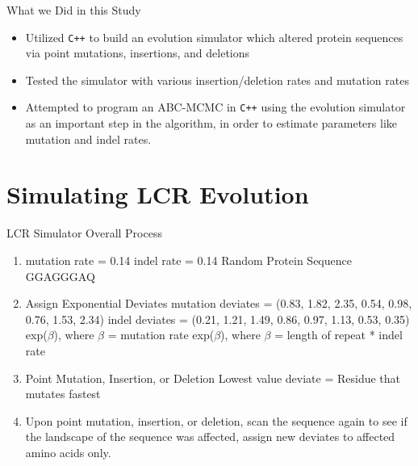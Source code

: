 \documentclass{beamer}
\begin{document}
	\begin{frame}{What we Did in this Study}
		\begin{itemize}
			\item Utilized \texttt{C++} to build an evolution simulator which altered protein sequences via point mutations, insertions, and deletions \newline
			\item Tested the simulator with various insertion/deletion rates and mutation rates \newline
			\item Attempted to program an ABC-MCMC in \texttt{C++} using the evolution simulator as an important step in the algorithm, in order to estimate parameters like mutation and indel rates.
		\end{itemize}
	\end{frame}

	\section{Simulating LCR Evolution}
	
	\begin{frame}{LCR Simulator Overall Process}
		\begin{center}
			\begin{enumerate}
			\item mutation rate = 0.14
				indel rate = 0.14 \newline
				Random Protein Sequence \newline	
				GGAGGGAQ \newline\pause	
				
				\item Assign Exponential Deviates \newline
				mutation deviates = (0.83, 1.82, 2.35, 0.54, 0.98, 0.76, 1.53, 2.34) \newline
				indel deviates = (0.21, 1.21, 1.49, 0.86, 0.97, 1.13, 0.53, 0.35) \newline
				\qquad exp($\beta$), where $\beta$ = mutation rate\newline 
				\qquad exp($\beta$), where $\beta$ = length of repeat * indel rate \newline \pause
				
				\item Point Mutation, Insertion, or Deletion \newline
				Lowest value deviate = Residue that mutates fastest \newline \pause
				
				\item Upon point mutation, insertion, or deletion, scan the sequence again to see if the landscape of the sequence was affected, assign new deviates to affected amino acids only.
				
			\end{enumerate}
		\end{center}	
	\end{frame}
\end{document}
